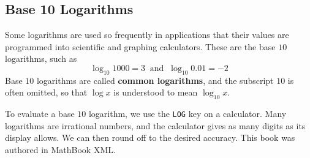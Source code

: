 \documentclass[10pt,]{book}
\newcommand{\terminology}[1]{\textbf{#1}}
\theoremstyle{plain}
\theoremstyle{definition}
\theoremstyle{definition}
\theoremstyle{definition}
\begin{document}
\subsection[Base 10 Logarithms]{Base 10 Logarithms}\label{subsection-3}

	Some logarithms are used so frequently in applications that their values are programmed into scientific and graphing calculators. These are the base \(10\) logarithms, such as 
	\begin{equation*}\log_{10}{1000} = 3 ~\text{ and }~ \log_{10}{0.01} = −2\end{equation*}
	Base \(10\) logarithms are called \terminology{common logarithms}, and the subscript \(10\) is often omitted, so that \(\log x\) is understood to mean \(\log_{10}{x}\).
%
\par

	To evaluate a base \(10\) logarithm, we use the \lstinline?LOG? key on a calculator. Many logarithms are irrational numbers, and the calculator gives as many digits as its display allows. We can then round off to the desired accuracy.
%
%
\printindex
%
This book was authored in MathBook XML.%
\end{document}
